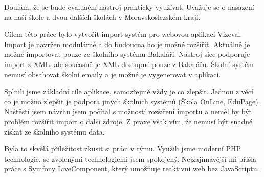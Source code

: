 Doufám, že se bude evaluační nástroj prakticky využívat.
Uvažuje se o nasazení na naší škole a dvou dalších školách v Moravskoslezském kraji.

Cílem této práce bylo vytvořit import systém pro webovou aplikaci Vizeval.
Import je navržen modulárně a do budoucna ho je možné rozšířit.
Aktuálně je možné importovat pouze ze školního systému Bakaláři.
Nástroj sice podporuje import z XML, ale současně je XML dostupné pouze z Bakalářů.
Školní systém nemusí obsahovat školní emaily a je možné je vygenerovat v aplikaci. 

Splnili jsme základní cíle aplikace, samozřejmě vždy je co zlepšit. 
Jednou z věcí co je možno zlepšit je podpora jiných školních systémů (Škola OnLine, EduPage).
Naštěstí jsem návrhu jsem počítal s možností rozšíření importu a neměl by být problém rozšířit import o další zdroje.
Z praxe však vím, že nemusí být snadné získat ze školního systému data.

Byla to skvělá příležitost zkusit si práci v týmu.
Využili jsme moderní PHP technologie, se zvolenými technologiemi jsem spokojený.
Nejzajímavější mi přišla práce s Symfony LiveComponent, který umožňuje reaktivní web bez JavaScriptu.
